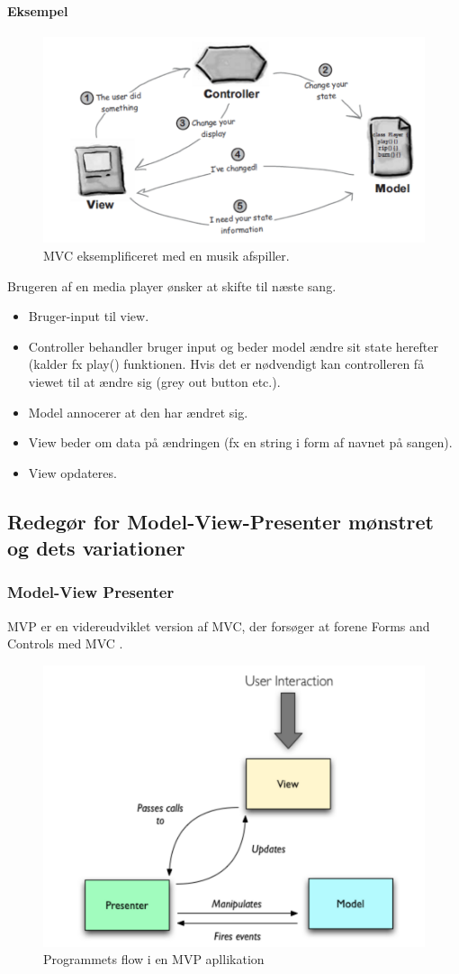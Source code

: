 \paragraph{Eksempel}
\begin{figure}[H]
	\centering
	\includegraphics[width=0.6\linewidth]{figs/mvcExample}
	\caption{MVC eksemplificeret med en musik afspiller.}
	\label{fig:mvcExample}
\end{figure}

Brugeren af en media player ønsker at skifte til næste sang.

\begin{itemize}
	\item Bruger-input til view.
	\item Controller behandler bruger input og beder model ændre sit state herefter (kalder fx play() funktionen. Hvis det er nødvendigt kan controlleren få viewet til at ændre sig (grey out button etc.).
	\item Model annocerer at den har ændret sig.
	\item View beder om data på ændringen (fx en string i form af navnet på sangen).
	\item View opdateres.
\end{itemize}

\subsection{Redegør for Model-View-Presenter mønstret og dets variationer}
\subsubsection{Model-View Presenter}
MVP er en videreudviklet version af MVC, der forsøger at forene Forms and Controls med MVC .

\begin{figure}[h]
	\centering
	\includegraphics[width=0.6\linewidth]{figs/mvpFlow}
	\caption{Programmets flow i en MVP apllikation}
	\label{fig:mvpFlow}
\end{figure}

